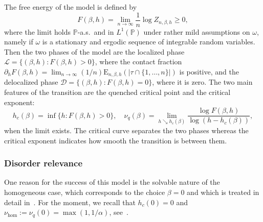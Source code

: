 \documentclass[11pt]{article}
\theoremstyle{definition}
\numberwithin{equation}{section}
\numberwithin{figure}{section}
\numberwithin{table}{section}
\newcommand{\bbP}{{\ensuremath{\mathbb P}}}
\newcommand{\cD}{{\ensuremath{\mathcal D}}}
\newcommand{\cL}{{\ensuremath{\mathcal L}}}
\newcommand{\ga}{\alpha}
\newcommand{\gb}{\beta}
\newcommand{\go}{\omega}
\newcommand\bE{\ensuremath{\mathrm{E}}}
\begin{document}
The free energy of the model is defined by
\begin{equation}
F(\gb,h) = \lim_{n \to \infty} \frac{1}{n} \log Z_{n,\gb,h} \geq 0,
\end{equation}
where the limit holds $\bbP$-a.s.~and in $L^1(\bbP)$ under rather mild assumptions on $\go$, namely if $\go$ is a stationary and ergodic sequence of integrable random variables. Then the two phases of the model are the localized phase $\cL = \{(\gb, h): F(\gb, h)>0\}$, where the contact fraction $\partial_h F(\gb,h) = \lim_{n \to \infty} (1/n) \bE_{n,\gb,h}(|\tau \cap \{1,\ldots,n\}|)$ is positive, and the delocalized phase $\cD = \{(\gb, h): F(\gb, h)=0\}$, where it is zero. The two main features of the transition are the quenched critical point and the critical exponent:
\begin{equation}
h_c(\gb) = \inf\{h \colon F(\gb,h) > 0\},\quad \nu_q(\gb) = \lim_{h \searrow h_c(\gb)} \frac{\log F(\gb,h)}{\log (h - h_c(\gb))},
\end{equation}
when the limit exists. The critical curve separates the two phases whereas the critical exponent indicates how smooth the transition is between them.

\subsubsection{Disorder relevance}

One reason for the success of this model is the solvable nature of the homogeneous case, which corresponds to the choice $\gb = 0$ and which is treated in detail in~\cite{Gi2007}. For the moment, we recall that $h_c(0) = 0$ and $\nu_{\hom}:= \nu_q(0) = \max(1,1/\ga)$, see~\cite[Theorem~2.1]{Gi2007}.
\end{document}
